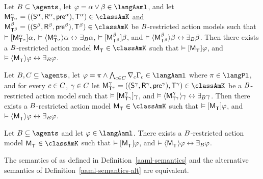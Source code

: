 \begin{lemma}
Let $\agentsB \subseteq \agents$, 
let $\phi = \alpha \lor \beta \in \langAaml$, and 
let $\aPModelAndTuple[\alpha]{\aStatesT[\alpha]} \in \classAmK$ and $\aPModelAndTuple[\beta]{\aStatesT[\beta]} \in \classAmK$ be $\agentsB$-restricted action models such that 
$\entails \actionA{\aPModel[\alpha]{\aStatesT[\alpha]}} \alpha$, 
$\entails \actionE{\aPModel[\alpha]{\aStatesT[\alpha]}} \alpha \iff \someactsBs \alpha$, 
$\entails \actionA{\aPModel[\beta]{\aStatesT[\beta]}} \beta$, and 
$\entails \actionE{\aPModel[\beta]{\aStatesT[\beta]}} \beta \iff \someactsBs \beta$.
Then there exists a $\agentsB$-restricted action model $\aPModel{\aStatesT} \in \classAmK$ such that 
$\entails \actionA{\aPModel{\aStatesT}} \phi$, and 
$\entails \actionE{\aPModel{\aStatesT}} \phi \iff \someactsBs \phi$.
\end{lemma}

\begin{lemma}
Let $\agentsB, \agentsC \subseteq \agents$, 
let $\phi = \pi \land \bigwedge_{\agentC \in \agentsC} \coverC \Gamma_\agentC \in \langAaml$ where $\pi \in \langPl$, and 
for every $\agentC \in \agentsC$, $\gamma \in \agentsC$
let $\aPModelAndTuple[\gamma]{\aStatesT[\gamma]} \in \classAmK$ be a $\agentsB$-restricted action model such that 
$\entails \actionA{\aPModel[\gamma]{\aStatesT[\gamma]}} \gamma$, and 
$\entails \actionE{\aPModel[\gamma]{\aStatesT[\gamma]}} \gamma \iff \someactsBs \gamma$.
Then there exists a $\agentsB$-restricted action model $\aPModel{\aStatesT} \in \classAmK$ such that 
$\entails \actionA{\aPModel{\aStatesT}} \phi$, and 
$\entails \actionE{\aPModel{\aStatesT}} \phi \iff \someactsBs \phi$.
\end{lemma}

\begin{theorem}
Let $\agentsB \subseteq \agents$ and let $\phi \in \langAaml$.
There exists a $\agentsB$-restricted action model $\aPModel{\aStatesT} \in \classAmK$ such that 
$\entails \actionA{\aPModel{\aStatesT}} \phi$, and 
$\entails \actionE{\aPModel{\aStatesT}} \phi \iff \someactsBs \phi$.
\end{theorem}

\begin{corollary}
The semantics of \logicAamlK{} as defined in Definition~\ref{aaml-semantics} and the alternative semantics of Definition~\ref{aaml-semantics-alt} are equivalent.
\end{corollary}
